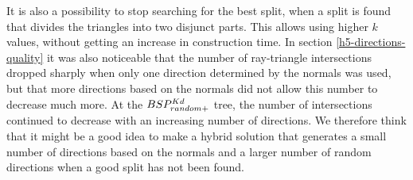 It is also a possibility to stop searching for the best split, when a split is found that divides the triangles into two disjunct parts.
This allows using higher $k$ values, without getting an increase in construction time.
In section \ref{h5-directions-quality} it was also noticeable that the number of ray-triangle intersections dropped sharply when only one direction determined by the normals was used, but that more directions based on the normals did not allow this number to decrease much more.
At the $BSP^{Kd}_{random+}$ tree, the number of intersections continued to decrease with an increasing number of directions.
We therefore think that it might be a good idea to make a hybrid solution that generates a small number of directions based on the normals and a larger number of random directions when a good split has not been found.